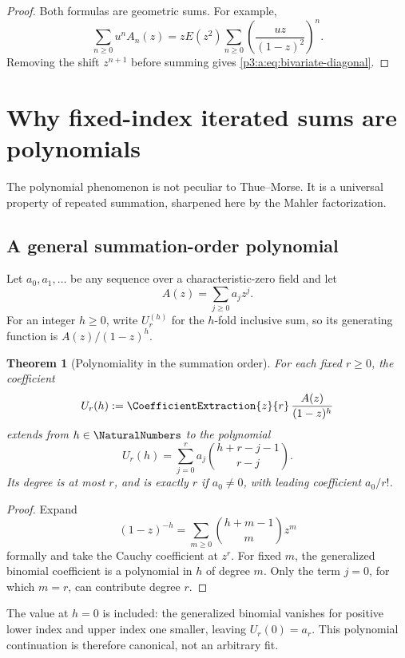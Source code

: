 \documentclass[11pt,oneside]{article}
\numberwithin{equation}{section}
\newtheorem{theorem}{Theorem}[section]
\theoremstyle{definition}
\theoremstyle{remark}
\begin{document}
\begin{proof}
Both formulas are geometric sums.  For example,
\[
 \sum_{n\ge0}u^nA_n(z)
 =zE(z^2)\sum_{n\ge0}
 \left(\frac{uz}{(1-z)^2}\right)^n.
\]
Removing the shift \(z^{n+1}\) before summing gives
\eqref{p3:a:eq:bivariate-diagonal}.
\end{proof}
\section{Why fixed-index iterated sums are polynomials}\label{p3:ch:polynomiality}

The polynomial phenomenon is not peculiar to Thue--Morse.  It is a universal
property of repeated summation, sharpened here by the Mahler factorization.

\subsection{A general summation-order polynomial}

Let \(a_0,a_1,\ldots\) be any sequence over a characteristic-zero field and
let
\[
 A(z)=\sum_{j\ge0}a_jz^j.
\]
For an integer \(h\ge0\), write \(U_r^{(h)}\) for the \(h\)-fold inclusive
sum, so its generating function is \(A(z)/(1-z)^h\).

\begin{theorem}[Polynomiality in the summation order]
For each fixed \(r\ge0\), the coefficient
\begin{equation}
 U_r(h):=\CoefficientExtraction{z}{r}\,{\frac{A(z)}{(1-z)^h}}
 \label{p3:a:eq:general-U}
\end{equation}
extends from \(h\in\NaturalNumbers\) to the polynomial
\begin{equation}
 \boxed{
 U_r(h)=\sum_{j=0}^{r}a_j
 \binom{h+r-j-1}{r-j}.}
 \label{p3:a:eq:general-order-polynomial}
\end{equation}
Its degree is at most \(r\), and is exactly \(r\) if \(a_0\ne0\), with
leading coefficient \(a_0/r!\).
\end{theorem}

\begin{proof}
Expand
\[
 (1-z)^{-h}=\sum_{m\ge0}\binom{h+m-1}{m}z^m
\]
formally and take the Cauchy coefficient at \(z^r\).  For fixed \(m\), the
generalized binomial coefficient is a polynomial in \(h\) of degree \(m\).
Only the term \(j=0\), for which \(m=r\), can contribute degree \(r\).
\end{proof}

The value at \(h=0\) is included: the generalized binomial vanishes for
positive lower index and upper index one smaller, leaving \(U_r(0)=a_r\).
This polynomial continuation is therefore canonical, not an arbitrary fit.
\end{document}
